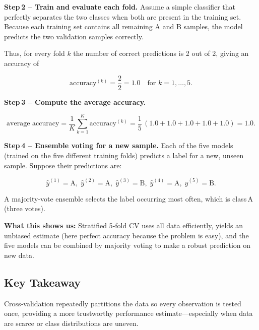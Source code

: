 \documentclass[12pt, a4paper]{article}
\begin{document}
\textbf{Step 2 – Train and evaluate each fold.}  
Assume a simple classifier that perfectly separates the two classes when both are present in the training set.  
Because each training set contains all remaining A and B samples, the model predicts the two validation samples correctly.  

Thus, for every fold \(k\) the number of correct predictions is 2 out of 2, giving an accuracy of  

\[
\text{accuracy}^{(k)} = \frac{2}{2}=1.0 \quad\text{for }k=1,\dots,5.
\]

\textbf{Step 3 – Compute the average accuracy.}  

\[
\text{average accuracy}= \frac{1}{K}\sum_{k=1}^{K}\text{accuracy}^{(k)}
= \frac{1}{5}\,(1.0+1.0+1.0+1.0+1.0)=1.0.
\]

\textbf{Step 4 – Ensemble voting for a new sample.}  
Each of the five models (trained on the five different training folds) predicts a label for a new, unseen sample.  
Suppose their predictions are:  

\[
\hat{y}^{(1)}=\text{A},\;
\hat{y}^{(2)}=\text{A},\;
\hat{y}^{(3)}=\text{B},\;
\hat{y}^{(4)}=\text{A},\;
\hat{y}^{(5)}=\text{B}.
\]

A majority‑vote ensemble selects the label occurring most often, which is class A (three votes).  

\textbf{What this shows us:}  
Stratified 5‑fold CV uses all data efficiently, yields an unbiased estimate (here perfect accuracy because the problem is easy), and the five models can be combined by majority voting to make a robust prediction on new data.  

\subsection{Key Takeaway}
Cross‑validation repeatedly partitions the data so every observation is tested once, providing a more trustworthy performance estimate—especially when data are scarce or class distributions are uneven.
\end{document}
